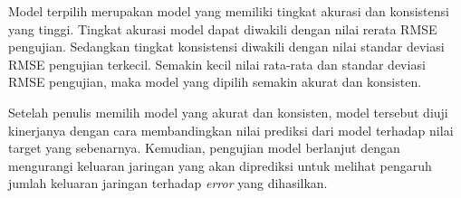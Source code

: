 Model terpilih merupakan model yang memiliki tingkat akurasi dan konsistensi yang tinggi. Tingkat akurasi model dapat diwakili dengan nilai rerata RMSE pengujian. Sedangkan tingkat konsistensi diwakili dengan nilai standar deviasi RMSE pengujian terkecil. Semakin kecil nilai rata-rata dan standar deviasi RMSE pengujian, maka model yang dipilih semakin akurat dan konsisten.

Setelah penulis memilih model yang akurat dan konsisten, model tersebut diuji kinerjanya dengan cara membandingkan nilai prediksi dari model terhadap nilai target yang sebenarnya. Kemudian, pengujian model berlanjut dengan mengurangi keluaran jaringan yang akan diprediksi untuk melihat pengaruh jumlah keluaran jaringan terhadap \textit{error} yang dihasilkan.